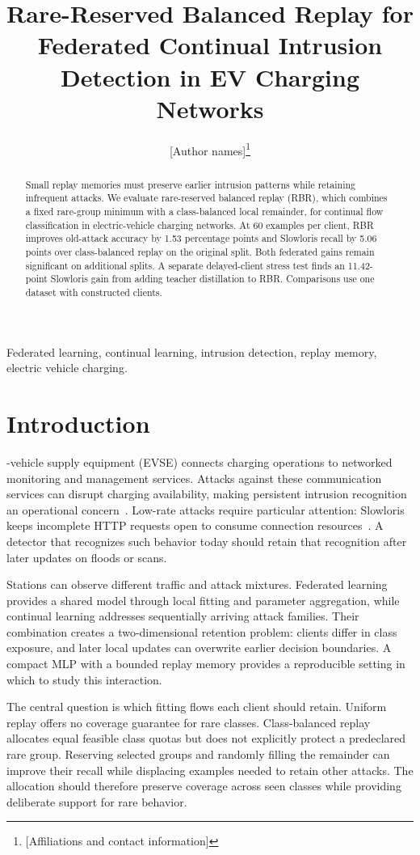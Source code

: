 \documentclass[journal,10pt]{IEEEtran}
\title{Rare-Reserved Balanced Replay for Federated Continual Intrusion Detection in EV Charging Networks}
\author{[Author names]\thanks{[Affiliations and contact information]}}
\begin{document}
\maketitle
\begin{abstract}
Small replay memories must preserve earlier intrusion patterns while retaining infrequent attacks. We evaluate rare-reserved balanced replay (RBR), which combines a fixed rare-group minimum with a class-balanced local remainder, for continual flow classification in electric-vehicle charging networks. At 60 examples per client, RBR improves old-attack accuracy by 1.53 percentage points and Slowloris recall by 5.06 points over class-balanced replay on the original split. Both federated gains remain significant on additional splits. A separate delayed-client stress test finds an 11.42-point Slowloris gain from adding teacher distillation to RBR. Comparisons use one dataset with constructed clients.
\end{abstract}
\begin{IEEEkeywords}
Federated learning, continual learning, intrusion detection, replay memory, electric vehicle charging.
\end{IEEEkeywords}
\section{Introduction}
-vehicle supply equipment (EVSE) connects charging operations to networked monitoring and management services. Attacks against these communication services can disrupt charging availability, making persistent intrusion recognition an operational concern~\cite{ocpp,dataset}. Low-rate attacks require particular attention: Slowloris keeps incomplete HTTP requests open to consume connection resources~\cite{slowloris}. A detector that recognizes such behavior today should retain that recognition after later updates on floods or scans.

Stations can observe different traffic and attack mixtures. Federated learning provides a shared model through local fitting and parameter aggregation, while continual learning addresses sequentially arriving attack families. Their combination creates a two-dimensional retention problem: clients differ in class exposure, and later local updates can overwrite earlier decision boundaries. A compact MLP with a bounded replay memory provides a reproducible setting in which to study this interaction.

The central question is which fitting flows each client should retain. Uniform replay offers no coverage guarantee for rare classes. Class-balanced replay allocates equal feasible class quotas but does not explicitly protect a predeclared rare group. Reserving selected groups and randomly filling the remainder can improve their recall while displacing examples needed to retain other attacks. The allocation should therefore preserve coverage across seen classes while providing deliberate support for rare behavior.
\end{document}
